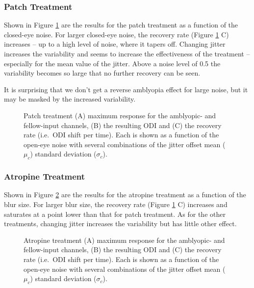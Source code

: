 \documentclass[
  sn-apa,
  pdflatex]{sn-jnl}
\theoremstyle{thmstyleone}%
\theoremstyle{thmstyletwo}%
\theoremstyle{thmstylethree}%
\begin{document}
\hypertarget{patch-treatment-1}{%
\subsubsection{Patch Treatment}\label{patch-treatment-1}}

Shown in Figure \ref{fig:patch-response-ODI-blur} are the results for
the patch treatment as a function of the closed-eye noise. For larger
closed-eye noise, the recovery rate (Figure
\ref{fig:patch-response-ODI-blur} C) increases -- up to a high level of
noise, where it tapers off. Changing jitter increases the variability
and seems to increase the effectiveness of the treatment -- especially
for the mean value of the jitter. Above a noise level of 0.5 the
variability becomes so large that no further recovery can be seen.

It is surprising that we don't get a reverse amblyopia effect for large
noise, but it may be masked by the increased variability.

\begin{figure}
\hypertarget{fig:patch-response-ODI-blur}{%
\centering

\caption{Patch treatment (A) maximum response for the amblyopic- and
fellow-input channels, (B) the resulting ODI and (C) the recovery rate
(i.e.~ODI shift per time). Each is shown as a function of the open-eye
noise with several combinations of the jitter offset mean (\(\mu_c\))
standard deviation (\(\sigma_c\)).}\label{fig:patch-response-ODI-blur}
}
\end{figure}

\hypertarget{atropine-treatment-1}{%
\subsubsection{Atropine Treatment}\label{atropine-treatment-1}}

Shown in Figure \ref{fig:atropine-response-ODI-blur} are the results for
the atropine treatment as a function of the blur size. For larger blur
size, the recovery rate (Figure \ref{fig:patch-response-ODI-blur} C)
increases and saturates at a point lower than that for patch treatment.
As for the other treatments, changing jitter increases the variability
but has little other effect.

\begin{figure}
\hypertarget{fig:atropine-response-ODI-blur}{%
\centering

\caption{Atropine treatment (A) maximum response for the amblyopic- and
fellow-input channels, (B) the resulting ODI and (C) the recovery rate
(i.e.~ODI shift per time). Each is shown as a function of the open-eye
noise with several combinations of the jitter offset mean (\(\mu_c\))
standard deviation
(\(\sigma_c\)).}\label{fig:atropine-response-ODI-blur}
}
\end{figure}
\end{document}
